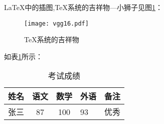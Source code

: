 \documentclass{ctexart}%
\begin{document}
	
	
	\LaTeX{}中的插图,\TeX 系统的吉祥物---小狮子见图\ref{fig}：	%
	
	\begin{figure}[htbp]%
		
		\centering	%
		\texttt{[image: vgg16.pdf]}
		\caption{\TeX 系统的吉祥物}\label{fig}	%
		
	\end{figure}
	
	如表\ref{key}所示：
	\begin{table}[h]
		\centering 
		\caption{考试成绩}\label{key}
		
		\begin{tabular}{l|| c |c| p{1.5cm}| r}	
			\hline	%
			姓名&语文&数学&外语&备注\\
			\hline \hline	%
			张三&87&100&93&优秀\\
			\hline 
			
		\end{tabular}
	\end{table}
\end{document}

